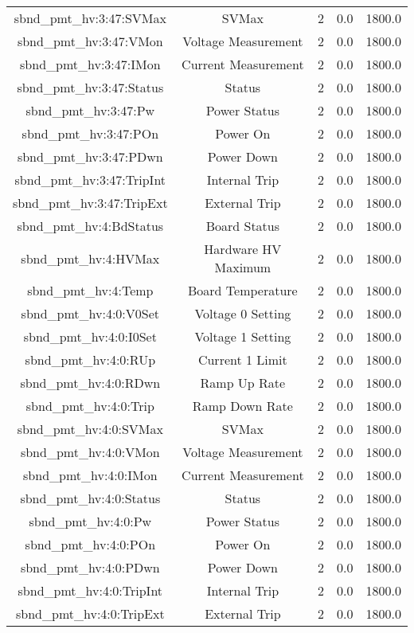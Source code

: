 \begin{center}
\begin{longtable}{c | c c c c }
sbnd\_pmt\_hv:3:47:SVMax & SVMax & 2 & 0.0 & 1800.0\\ 
sbnd\_pmt\_hv:3:47:VMon & Voltage Measurement & 2 & 0.0 & 1800.0\\ 
sbnd\_pmt\_hv:3:47:IMon & Current Measurement & 2 & 0.0 & 1800.0\\ 
sbnd\_pmt\_hv:3:47:Status & Status & 2 & 0.0 & 1800.0\\ 
sbnd\_pmt\_hv:3:47:Pw & Power Status & 2 & 0.0 & 1800.0\\ 
sbnd\_pmt\_hv:3:47:POn & Power On & 2 & 0.0 & 1800.0\\ 
sbnd\_pmt\_hv:3:47:PDwn & Power Down & 2 & 0.0 & 1800.0\\ 
sbnd\_pmt\_hv:3:47:TripInt & Internal Trip & 2 & 0.0 & 1800.0\\ 
sbnd\_pmt\_hv:3:47:TripExt & External Trip & 2 & 0.0 & 1800.0\\ 
sbnd\_pmt\_hv:4:BdStatus & Board Status & 2 & 0.0 & 1800.0\\ 
sbnd\_pmt\_hv:4:HVMax & Hardware HV Maximum & 2 & 0.0 & 1800.0\\ 
sbnd\_pmt\_hv:4:Temp & Board Temperature & 2 & 0.0 & 1800.0\\ 
sbnd\_pmt\_hv:4:0:V0Set & Voltage 0 Setting & 2 & 0.0 & 1800.0\\ 
sbnd\_pmt\_hv:4:0:I0Set & Voltage 1 Setting & 2 & 0.0 & 1800.0\\ 
sbnd\_pmt\_hv:4:0:RUp & Current 1 Limit & 2 & 0.0 & 1800.0\\ 
sbnd\_pmt\_hv:4:0:RDwn & Ramp Up Rate & 2 & 0.0 & 1800.0\\ 
sbnd\_pmt\_hv:4:0:Trip & Ramp Down Rate & 2 & 0.0 & 1800.0\\ 
sbnd\_pmt\_hv:4:0:SVMax & SVMax & 2 & 0.0 & 1800.0\\ 
sbnd\_pmt\_hv:4:0:VMon & Voltage Measurement & 2 & 0.0 & 1800.0\\ 
sbnd\_pmt\_hv:4:0:IMon & Current Measurement & 2 & 0.0 & 1800.0\\ 
sbnd\_pmt\_hv:4:0:Status & Status & 2 & 0.0 & 1800.0\\ 
sbnd\_pmt\_hv:4:0:Pw & Power Status & 2 & 0.0 & 1800.0\\ 
sbnd\_pmt\_hv:4:0:POn & Power On & 2 & 0.0 & 1800.0\\ 
sbnd\_pmt\_hv:4:0:PDwn & Power Down & 2 & 0.0 & 1800.0\\ 
sbnd\_pmt\_hv:4:0:TripInt & Internal Trip & 2 & 0.0 & 1800.0\\ 
sbnd\_pmt\_hv:4:0:TripExt & External Trip & 2 & 0.0 & 1800.0\\ 

\end{longtable}
\end{center}
